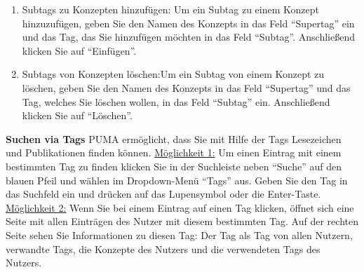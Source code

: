 \begin{enumerate}
\begin{enumerate}
        \item Subtags zu Konzepten hinzufügen: \newline
        Um ein Subtag zu einem Konzept hinzuzufügen, geben Sie den Namen des Konzepts in das Feld \enquote{Supertag} ein und das Tag, das Sie hinzufügen möchten in das Feld \enquote{Subtag}. Anschließend klicken Sie auf \enquote{Einfügen}.
        \item Subtags von Konzepten löschen:\newline Um ein Subtag von einem Konzept zu löschen, geben Sie den Namen des Konzepts in das Feld \enquote{Supertag} und das Tag, welches Sie löschen wollen, in das Feld \enquote{Subtag} ein. Anschließend klicken Sie auf \enquote{Löschen}.
    \end{enumerate}
\end{enumerate}
\textbf{Suchen via Tags}\newline
PUMA ermöglicht, dass Sie mit Hilfe der Tags Lesezeichen und Publikationen finden können. \newline\newline
\underline{Möglichkeit 1:} Um einen Eintrag mit einem bestimmten Tag zu finden klicken Sie in der Suchleiste neben \enquote{Suche} auf den blauen Pfeil und wählen im Dropdown-Menü \enquote{Tags} aus. Geben Sie den Tag in das Suchfeld ein und drücken auf das Lupensymbol oder die Enter-Taste.\newline \newline
\underline{Möglichkeit 2:} Wenn Sie bei einem Eintrag auf einen Tag klicken, öffnet sich eine Seite mit allen Einträgen des Nutzer mit diesem bestimmten Tag. Auf der rechten Seite sehen Sie Informationen zu diesen Tag: Der Tag als Tag von allen Nutzern, verwandte Tags, die Konzepte des Nutzers und die verwendeten Tags des Nutzers. 
\newline
\newline
